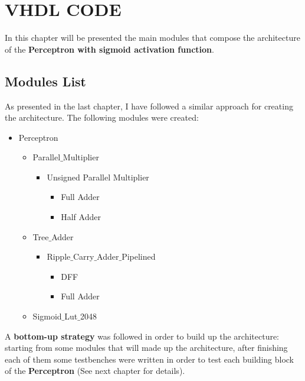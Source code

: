 \section{VHDL CODE}
In this chapter will be presented the main modules that compose the architecture of the \textbf{Perceptron with sigmoid activation function}.
\subsection{Modules List}
As presented in the last chapter, I have followed a similar approach for creating the architecture. The following modules were created:

\begin{itemize}
	\item Perceptron
	\begin{itemize}
		\item Parallel$\_$Multiplier
  		\begin{itemize}
  			\item Unsigned Parallel Multiplier
  			\begin{itemize}
	  			\item Full Adder
	  			\item Half Adder
  			\end{itemize}
		\end{itemize}
	\end{itemize}
	\begin{itemize}
		\item Tree$\_$Adder
		\begin{itemize}
			\item Ripple$\_$Carry$\_$Adder$\_$Pipelined
			\begin{itemize}
				\item DFF
				\item Full Adder
			\end{itemize} 
		\end{itemize} 
	\end{itemize}
	\begin{itemize}
		\item Sigmoid$\_$Lut$\_$2048
	\end{itemize}
\end{itemize}

A \textbf{bottom-up strategy} was followed in order to build up the architecture: starting from some modules that will made up the architecture, after finishing each of them some testbenches were written in order to test each building block of the \textbf{Perceptron} (See next chapter for details).
